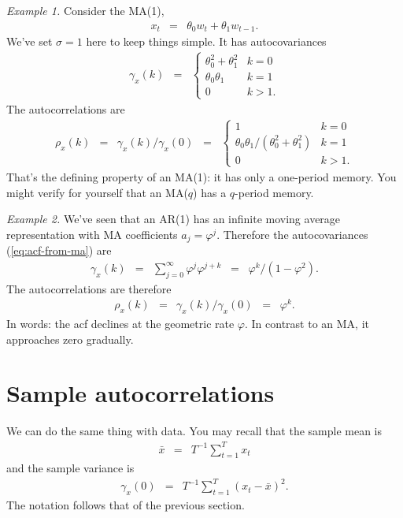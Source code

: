 \documentclass[11pt]{article}
\begin{document}
{\it Example 1.\/}
Consider the MA(1),
\begin{eqnarray*}
    x_t &=& \theta_0 w_t + \theta_1 w_{t-1} .
\end{eqnarray*}
We've set $\sigma = 1$ here to keep things simple.
It has autocovariances
\begin{eqnarray*}
    \gamma_x(k) &=&
            \left\{
            \begin{array}{ll}
            \theta_0^2 + \theta_1^2 & k=0 \\
            \theta_0\theta_1  & k=1 \\
            0       &  k > 1 .
            \end{array}
            \right.
\end{eqnarray*}
The autocorrelations are
\begin{eqnarray*}
    \rho_x(k) &=& \gamma_x(k)/\gamma_x(0)
        \;\;=\;\;
            \left\{
            \begin{array}{ll}
            1  & k=0 \\
            \theta_0\theta_1/(\theta_0^2 + \theta_1^2)  & k=1 \\
            0       &  k > 1 .
            \end{array}
            \right.
\end{eqnarray*}
That's the defining property of an MA(1):  %
it has only a one-period memory.
You might verify for yourself that an MA($q$) has a $q$-period memory.

{\it Example 2.\/}
We've seen that an AR(1) has an infinite moving average representation
with MA coefficients $a_j = \varphi^j$.
Therefore the autocovariances (\ref{eq:acf-from-ma}) are
\begin{eqnarray*}
    \gamma_x(k) &=& \sum_{j=0}^\infty \varphi^j \varphi^{j+k}
            \;\;=\;\; \varphi^k/(1-\varphi^2) .
\end{eqnarray*}
The autocorrelations are therefore
\begin{eqnarray*}
    \rho_x(k) &=& \gamma_x(k) / \gamma_x(0)
            \;\;=\;\; \varphi^k .
\end{eqnarray*}
In words:  the acf declines at the geometric rate $\varphi$.
In contrast to an MA, it approaches zero gradually.


\section{Sample autocorrelations}

We can do the same thing with data.
You may recall that the sample mean is
\begin{eqnarray*}
    \bar{x} &=& T^{-1} \sum_{t=1}^T x_{t}
\end{eqnarray*}
and the sample variance is
\begin{eqnarray*}
    \gamma_x(0)  &=&   T^{-1} \sum_{t=1}^T (x_{t}-\bar{x})^2 .
\end{eqnarray*}
The notation follows that of the previous section.
\end{document}
